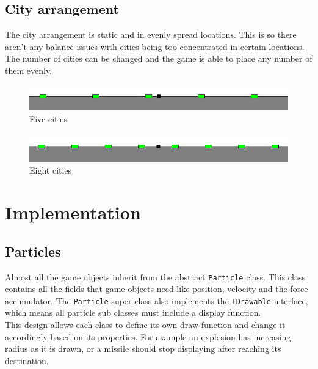 \documentclass{article}
\newcommand{\n}[0]{\\[\baselineskip]}
\begin{document}
\subsection{City arrangement}
The city arrangement is static and in evenly spread locations. This is so there aren't any balance issues with cities being too concentrated in certain locations. The number of cities can be changed and the game is able to place any number of them evenly. 
\begin{figure}[H]
\centering
\includegraphics[width=1\textwidth, keepaspectratio]{imgs/FiveCities.png}
\caption{Five cities}
\end{figure}

\begin{figure}[H]
\centering
\includegraphics[width=1\textwidth, keepaspectratio]{imgs/EightCities.png}
\caption{Eight cities}
\end{figure}
\noindent

\section{Implementation}
\subsection{Particles}
Almost all the game objects inherit from the abstract \texttt{Particle} class. This class contains all the fields that game objects need like position, velocity and the force accumulator. The \texttt{Particle} super class also implements the \texttt{IDrawable} interface, which means all particle sub classes must include a display function.
\n
This design allows each class to define its own draw function and change it accordingly based on its properties. For example an explosion has increasing radius as it is drawn, or a missile should stop displaying after reaching its destination. 
\end{document}
